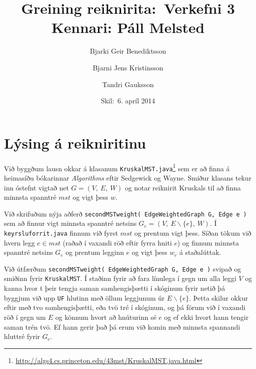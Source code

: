 \documentclass[a4paper,oneside]{article}
\title{
    Greining reiknirita:\ Verkefni 3
    \\\small{Kennari: Páll Melsted}
}
\author{Bjarki Geir Benediktsson \and  Bjarni Jens Kristinsson \and Tandri Gauksson}
\date{\small{Skil:\ 6. apríl 2014}}
\begin{document}
\maketitle

\section{Lýsing á reikniritinu}
Við byggðum lausn okkar á klasanum \texttt{KruskalMST.java}\footnote{\url{http://algs4.cs.princeton.edu/43mst/KruskalMST.java.html}} sem er að finna á heimasíðu bókarinnar \emph{Algorithms} eftir Sedgewick og Wayne. Smiður klasans tekur inn óstefnt vigtað net $G=(V, \ E, \ W)$ og notar reiknirit Kruskals til að finna minnsta spanntré $mst$ og vigt þess $w$.

Við skrifuðum nýja aðferð \texttt{secondMSTweight( EdgeWeightedGraph G, Edge e )} sem að finnur vigt minnsta spanntré netsins $G_e=(V, \ E \smallsetminus \{ e \}, \ W)$. Í \texttt{keyrsluforrit.java} finnum við fyrst $mst$ og prentum vigt þess. Síðan tökum við hvern legg $e \in mst$ (raðað í vaxandi röð eftir fyrra hniti $e$) og finnum minnsta spanntré netsins $G_e$ og prentum legginn $e$ og vigt þess $w_e$ á staðalúttak. 

Við útfærðum \texttt{secondMSTweight( EdgeWeightedGraph G, Edge e )} svipað og smiðinn fyrir \texttt{KruskalMST}. Í staðinn fyrir að fara línulega í gegn um alla leggi $V$ og kanna hvor t þeir tengja saman samhengisþætti í skóginum fyrir netið þá byggjum við upp \texttt{UF} hlutinn með öllum leggjunum úr $E \smallsetminus \{ e \}$. Þetta skilur okkur eftir með tvo samhengisþætti, eða tvö tré í skóginum, og þá förum við í vaxandi röð í gegn um $E$ og könnum hvort að hnúturinn sé $e$ og ef ekki hvort hann tengir saman trén tvö. Ef hann gerir það þá erum við komin með minnsta spannandi hluttré fyrir $G_e$. \\
\end{document}
